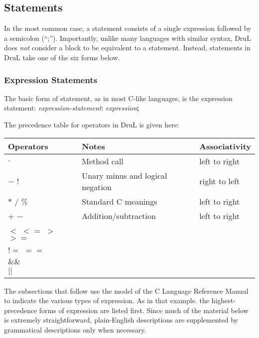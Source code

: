\subsection{Statements}

In the most common case, a statement consists of a single expression followed by a semicolon (``;'').  Importantly, unlike many languages with similar syntax, DruL does \emph{not} consider a block to be equivalent to a statement.  Instead, statements in DruL take one of the six forms below.

\subsubsection{Expression Statements}

The basic form of statement, as in most C-like languages, is the expression statement: \emph{expression-statement}: \emph{expression}\textbf{;}

The precedence table for operators in DruL is given here:

\begin{tabular}{ l |l| l}
\hline\hline
Operators         & Notes                            & Associativity \\ \hline
$ . $             & Method call                      & left to right \\
$-$  $!$          & Unary minus and logical negation & right to left \\
$*$ $/$ $\%$      & Standard C meanings              & left to right \\
$+$ $-$           & Addition/subtraction             & left to right \\
$<$ $<=$ $>$ $>=$ &                                  &               \\
$!=$ $==$         &                                  &               \\
$\&\&$            &                                  &               \\
$||$              &                                  &
\end{tabular}

The subsections that follow use the model of the C Language Reference Manual to indicate the various types of expression.  As in that example. the highest-precedence forms of expression are listed first.  Since much of the material below is extremely straightforward, plain-English descriptions are supplemented by grammatical descriptions only when necessary.

